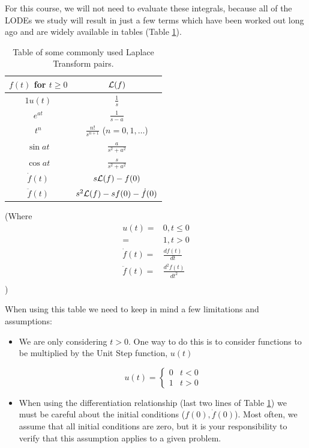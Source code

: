 For this course, we will not need to evaluate these integrals, because all of the LODEs we study will result in just a few terms which have been worked out long ago and are widely available in tables (Table \ref{LaplaceTransformTable}).



\begin{table}\centering
\renewcommand\arraystretch{2.0}%
\begin{tabular}{|c|c|}
\hline
$ f(t)$ { for} $t \geq 0$ &  $\mathcal{L}(f)$\\
\hline
$1u(t)$      & $\displaystyle \frac{1}{s}$\\\hline
$e^{at}$ & $\displaystyle \frac{1}{s-a}$\\ \hline
$t^n$    & $\displaystyle \frac{n!}{s^{n+1}}$ ($n = 0,1, \ldots$)\\ \hline
$\sin at$ & $\displaystyle \frac{a}{s^2 + a^2}$\\ \hline
$\cos at$ & $\displaystyle \frac{s}{s^2 + a^2}$\\ \hline
$\dot{f}(t)$ & $s{\cal L}(f)-f(0)$\\ \hline
$\ddot{f}(t)$ & $s^2{\cal L}(f)-sf(0)-\dot{f}(0)$
\\ \hline
\end{tabular}

(Where
\[
  \begin{aligned}
    u(t) =&  0, t \le 0\\
         =&  1, t > 0\\
    \dot{f}(t) =& \frac{df(t)}{dt}\\
    \ddot{f}(t) =& \frac{d^2f(t)}{dt^2}\\
  \end{aligned}
\]
)

\caption{Table of some commonly used Laplace Transform pairs.}\label{LaplaceTransformTable}
\end{table}


When using this table we need to keep in mind a few limitations and assumptions:

\begin{itemize}
  \item We are only considering $t>0$.   One way to do this is to consider functions to be multiplied by the Unit Step function, $u(t)$

\[
  u(t) = \left \{ \begin{array}{ll}  0 & t < 0 \\ 1 & t > 0 \end{array} \right .
\]

  \item When using the differentiation relationship (last two lines of Table \ref{LaplaceTransformTable}) we must be careful about the initial conditions ($f(0), \dot{f}(0)$).    Most often, we assume that all initial conditions are zero, but it is your responsibility to verify that this assumption applies to a given problem.
\end{itemize}




